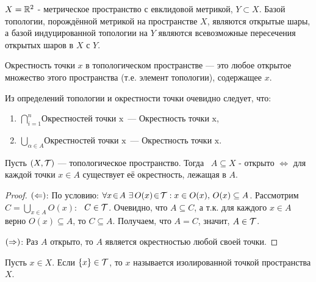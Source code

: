 \begin{example}
    $X = \mathbb{R}^2$ - метрическое пространство с евклидовой метрикой, $Y \subset X$. Базой топологии, порождённой метрикой на пространстве $X$, являются открытые шары, а базой индуцированной топологии на $Y$ являются всевозможные пересечения открытых шаров в $X$ с $Y$.
\end{example}

\begin{definition}
    Окрестность точки $x$ в топологическом пространстве --- это любое открытое множество этого пространства (т.е. элемент топологии), содержащее $x$.
\end{definition}

\begin{nota_bene} Из определений топологии и окрестности точки очевидно следует, что:
    \begin{enumerate}
        \item $\bigcap_{i = 1}^{n} \text{Окрестностей точки x}$ --- $\text{Окрестность точки x}$,
        \item $\bigcup_{\alpha \in A} \text{Окрестностей точки x}$ --- $\text{Окрестность точки x}$.
    \end{enumerate}
\end{nota_bene}

\begin{statement}
    Пусть $(X, \mathcal{T})$ --- топологическое пространство. Тогда \ $A \subseteq X$ - открыто $\Leftrightarrow$ для каждой точки $x \in A$ существует её окрестность, лежащая в $A$.
\end{statement}
\begin{proof}
    
    $\left(\Leftarrow\right)$: По условию: $\forall x \! \in \! A \ \exists \, O(x) \! \in \! \mathcal{T}: x \in O(x), \, O(x) \subseteq A$. Рассмотрим $C = \bigcup_{x \in A} O(x)$: \ $C \in \mathcal{T}$. 
    Очевидно, что $A \subseteq C$, а т.к. для каждого $x \in A$ верно $O(x) \subseteq A$, то $C \subseteq A$. Получаем, что $A = C$, значит, $A \in \mathcal{T}$.

    $\left(\Rightarrow\right)$: Раз $A$ открыто, то $A$ является окрестностью любой своей точки.
\end{proof}

\begin{definition}
    Пусть $x \in X$. Если $\left\{x\right\} \in \mathcal{T}$, то $x$ называется изолированной точкой пространства $X$.
\end{definition}

